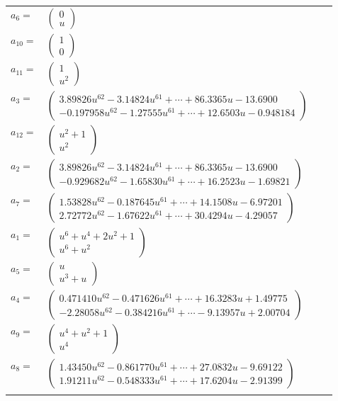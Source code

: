 \documentclass[1p]{elsarticle_modified}
\theoremstyle{definition}
\begin{document}
\begin{tabular}{m{7pt} m{180pt} m{7pt} m{180pt} }
\flushright $a_{6}=$&$\begin{pmatrix}0\\u\end{pmatrix}$ \\
\flushright $a_{10}=$&$\begin{pmatrix}1\\0\end{pmatrix}$ \\
\flushright $a_{11}=$&$\begin{pmatrix}1\\u^2\end{pmatrix}$ \\
\flushright $a_{3}=$&$\begin{pmatrix}3.89826 u^{62}-3.14824 u^{61}+\cdots+86.3365 u-13.6900\\-0.197958 u^{62}-1.27555 u^{61}+\cdots+12.6503 u-0.948184\end{pmatrix}$ \\
\flushright $a_{12}=$&$\begin{pmatrix}u^2+1\\u^2\end{pmatrix}$ \\
\flushright $a_{2}=$&$\begin{pmatrix}3.89826 u^{62}-3.14824 u^{61}+\cdots+86.3365 u-13.6900\\-0.929682 u^{62}-1.65830 u^{61}+\cdots+16.2523 u-1.69821\end{pmatrix}$ \\
\flushright $a_{7}=$&$\begin{pmatrix}1.53828 u^{62}-0.187645 u^{61}+\cdots+14.1508 u-6.97201\\2.72772 u^{62}-1.67622 u^{61}+\cdots+30.4294 u-4.29057\end{pmatrix}$ \\
\flushright $a_{1}=$&$\begin{pmatrix}u^6+u^4+2 u^2+1\\u^6+u^2\end{pmatrix}$ \\
\flushright $a_{5}=$&$\begin{pmatrix}u\\u^3+u\end{pmatrix}$ \\
\flushright $a_{4}=$&$\begin{pmatrix}0.471410 u^{62}-0.471626 u^{61}+\cdots+16.3283 u+1.49775\\-2.28058 u^{62}-0.384216 u^{61}+\cdots-9.13957 u+2.00704\end{pmatrix}$ \\
\flushright $a_{9}=$&$\begin{pmatrix}u^4+u^2+1\\u^4\end{pmatrix}$ \\
\flushright $a_{8}=$&$\begin{pmatrix}1.43450 u^{62}-0.861770 u^{61}+\cdots+27.0832 u-9.69122\\1.91211 u^{62}-0.548333 u^{61}+\cdots+17.6204 u-2.91399\end{pmatrix}$\\&\end{tabular}
\end{document}
